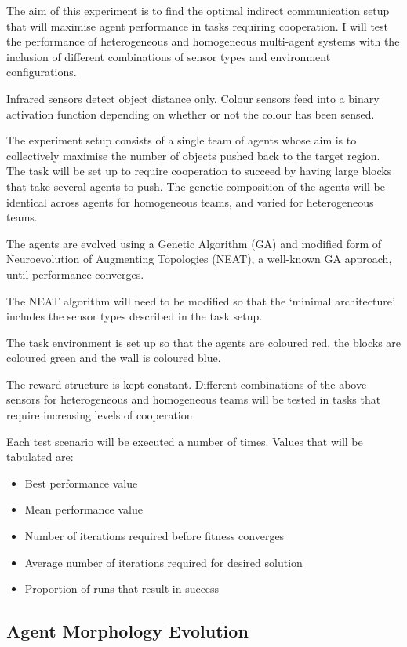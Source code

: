 \documentclass[a4paper,12pt]{article}
\begin{document}
The aim of this experiment is to find the optimal indirect communication setup that will maximise agent performance in tasks requiring cooperation. I will test the performance of heterogeneous and homogeneous multi-agent systems with the inclusion of different combinations of sensor types and environment configurations.

Infrared sensors detect object distance only. Colour sensors feed into a binary activation function depending on whether or not the colour has been sensed.

The experiment setup consists of a single team of agents whose aim is to collectively maximise the number of objects pushed back to the target region. The task will be set up to require cooperation to succeed by having large blocks that take several agents to push. The genetic composition of the agents will be identical across agents for homogeneous teams, and varied for heterogeneous teams.

The agents are evolved using a Genetic Algorithm (GA) and modified form of Neuroevolution of Augmenting Topologies (NEAT), a well-known GA approach\cite{Stanley02}, until performance converges.

The NEAT algorithm will need to be modified so that the ‘minimal architecture’ includes the sensor types described in the task setup.

The task environment is set up so that the agents are coloured red, the blocks are coloured green and the wall is coloured blue.

The reward structure is kept constant. Different combinations of the above sensors for heterogeneous and homogeneous teams will be tested in tasks that require increasing levels of cooperation

Each test scenario will be executed a number of times. Values that will be tabulated are:
\begin{itemize}
\item Best performance value
\item Mean performance value
\item Number of iterations required before fitness converges
\item Average number of iterations required for desired solution
\item Proportion of runs that result in success
\end{itemize}

\subsection{Agent Morphology Evolution}
\end{document}

